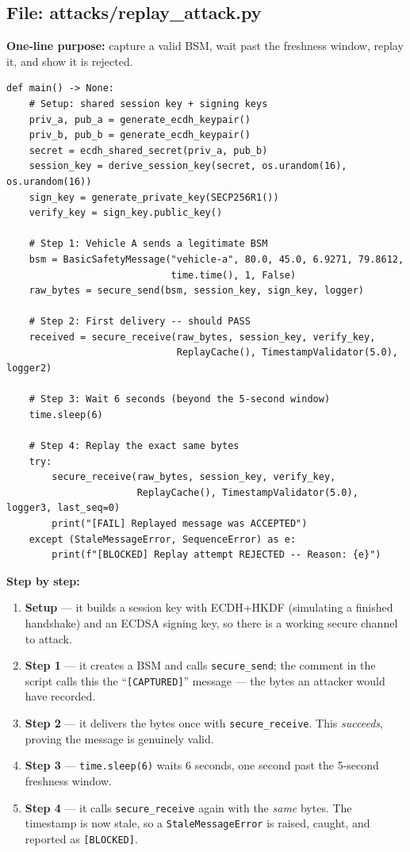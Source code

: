 \documentclass[11pt,a4paper]{report}
\begin{document}
\subsection{File: attacks/replay\_attack.py}
\textbf{One-line purpose:} capture a valid BSM, wait past the freshness window,
replay it, and show it is rejected.
\begin{lstlisting}[style=py,caption={replay\_attack.py --- the replay attack (key parts).}]
def main() -> None:
    # Setup: shared session key + signing keys
    priv_a, pub_a = generate_ecdh_keypair()
    priv_b, pub_b = generate_ecdh_keypair()
    secret = ecdh_shared_secret(priv_a, pub_b)
    session_key = derive_session_key(secret, os.urandom(16), os.urandom(16))
    sign_key = generate_private_key(SECP256R1())
    verify_key = sign_key.public_key()

    # Step 1: Vehicle A sends a legitimate BSM
    bsm = BasicSafetyMessage("vehicle-a", 80.0, 45.0, 6.9271, 79.8612,
                             time.time(), 1, False)
    raw_bytes = secure_send(bsm, session_key, sign_key, logger)

    # Step 2: First delivery -- should PASS
    received = secure_receive(raw_bytes, session_key, verify_key,
                              ReplayCache(), TimestampValidator(5.0), logger2)

    # Step 3: Wait 6 seconds (beyond the 5-second window)
    time.sleep(6)

    # Step 4: Replay the exact same bytes
    try:
        secure_receive(raw_bytes, session_key, verify_key,
                       ReplayCache(), TimestampValidator(5.0), logger3, last_seq=0)
        print("[FAIL] Replayed message was ACCEPTED")
    except (StaleMessageError, SequenceError) as e:
        print(f"[BLOCKED] Replay attempt REJECTED -- Reason: {e}")
\end{lstlisting}
\textbf{Step by step:}
\begin{enumerate}
  \item \textbf{Setup} --- it builds a session key with ECDH+HKDF (simulating a
        finished handshake) and an ECDSA signing key, so there is a working
        secure channel to attack.
  \item \textbf{Step 1} --- it creates a BSM and calls \texttt{secure\_send}; the
        comment in the script calls this the ``\texttt{[CAPTURED]}'' message ---
        the bytes an attacker would have recorded.
  \item \textbf{Step 2} --- it delivers the bytes once with
        \texttt{secure\_receive}. This \emph{succeeds}, proving the message is
        genuinely valid.
  \item \textbf{Step 3} --- \texttt{time.sleep(6)} waits 6 seconds, one second
        past the 5-second freshness window.
  \item \textbf{Step 4} --- it calls \texttt{secure\_receive} again with the
        \emph{same} bytes. The timestamp is now stale, so a
        \texttt{StaleMessageError} is raised, caught, and reported as
        \texttt{[BLOCKED]}.
\end{enumerate}
\end{document}
